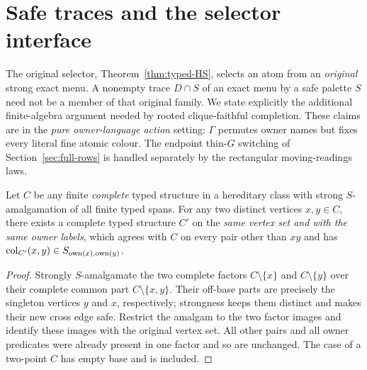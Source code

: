 
\section{Safe traces and the selector interface}
\label{sec:safe-traces}

The original selector, Theorem~\ref{thm:typed-HS}, selects
an atom from an \emph{original} strong exact menu.
A nonempty trace $D\cap S$ of an exact menu by a safe palette
$S$ need not be a member of that original family.  We state
explicitly the additional finite-algebra argument needed by
rooted clique-faithful completion.  These claims are in the
\emph{pure owner-language action} setting: $\Gamma$ permutes
owner names but fixes every literal fine atomic colour.
The endpoint thin-$G$ switching of Section~\ref{sec:full-rows}
is handled separately by the rectangular moving-readings laws.

\begin{lemma}
\label{lem:one-edge-safe-recolour}
Let $C$ be any finite \emph{complete} typed structure in a
hereditary class with strong $S$-amalgamation of all finite
typed spans.  For any two distinct vertices $x,y\in C$,
there exists a complete typed structure $C'$ on the
\emph{same vertex set and with the same owner labels},
which agrees with $C$ on every pair other than $xy$
and has $\operatorname{col}_{C'}(x,y)\in S_{\operatorname{own}(x),\operatorname{own}(y)}$.
\end{lemma}
\begin{proof}
Strongly $S$-amalgamate the two complete factors
$C\setminus\{x\}$ and $C\setminus\{y\}$ over their complete
common part $C\setminus\{x,y\}$.  Their off-base parts are
precisely the singleton vertices $y$ and $x$, respectively;
strongness keeps them distinct and makes their new cross edge
safe.  Restrict the amalgam to the two factor images and identify
these images with the original vertex set.  All other pairs and
all owner predicates were already present in one factor and so
are unchanged.  The case of a two-point $C$ has empty base
and is included.
\end{proof}


